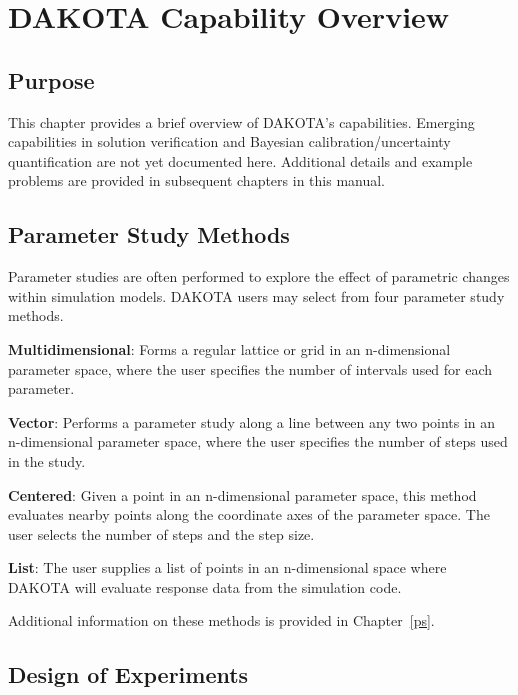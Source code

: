 \chapter{DAKOTA Capability Overview}\label{capabilities}

\section{Purpose}\label{capabilities:purpose}

This chapter provides a brief overview of DAKOTA's capabilities.
Emerging capabilities in solution verification and Bayesian
calibration/uncertainty quantification are not yet documented here.
Additional details and example problems are provided in subsequent
chapters in this manual.

\section{Parameter Study Methods}\label{capabilities:parameter}

Parameter studies are often performed to explore the effect of
parametric changes within simulation models. DAKOTA users may select
from four parameter study methods.

\textbf{Multidimensional}: Forms a regular lattice or grid in an
n-dimensional parameter space, where the user specifies the number of
intervals used for each parameter.

\textbf{Vector}: Performs a parameter study along a line between any two
points in an n-dimensional parameter space, where the user specifies
the number of steps used in the study.

\textbf{Centered}: Given a point in an n-dimensional parameter space,
this method evaluates nearby points along the coordinate axes of the
parameter space. The user selects the number of steps and the step
size.

\textbf{List}: The user supplies a list of points in an n-dimensional
space where DAKOTA will evaluate response data from the simulation
code.

Additional information on these methods is provided in Chapter~\ref{ps}.

\section{Design of Experiments}\label{capabilities:sampling}

